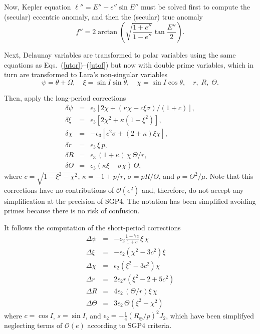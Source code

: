 \documentclass{article}
\begin{document}
Now, Kepler equation $\ell''=E''-e''\sin{E}''$ must be solved first to compute the (secular) eccentric anomaly, and then the (secular) true anomaly
\[
f''=2\arctan\left(\sqrt{\frac{1+e''}{1-e''}}\tan\frac{E''}{2}\right).
\]
\par

Next, Delaunay variables are transformed to polar variables using the same equations as Eqs.~(\ref{utor})--(\ref{utof}) but now with double prime variables, which in turn are transformed to Lara's non-singular variables
\[
\psi=\theta+\Omega,\quad \xi=\sin{I}\sin\theta,\quad \chi=\sin{I}\cos\theta,\quad r,\; R,\; \Theta.
\]


Then, apply the long-period corrections
\begin{eqnarray*} \label{dyns}
\delta\psi &=& \epsilon_3\left[2 \chi+(\kappa  \chi -c \xi  \sigma)/(1+c)\right],
\\  \label{dxins}
\delta\xi &=&
\epsilon_3\left[2 \chi ^2+\kappa  \left(1-\xi ^2\right) \right],
\\ \label{dchins}
\delta\chi &=& %
-\epsilon_3\left[c^2 \sigma +(2+\kappa) \xi  \chi \right],
\\ \label{drns}
\delta{r} &=& \epsilon_3\,\xi\,p,
\\ \label{dRRns}
\delta{R} &=& %
\epsilon_3\,(1+\kappa)\,\chi\,\Theta/r,
\\ \label{dZZns}
\delta\Theta &=&\epsilon_3(\kappa\xi-\sigma\chi)\,\Theta,
\end{eqnarray*}
where $c=\sqrt{1-\xi^2-\chi^2}$, $\kappa=-1+p/r$, $\sigma=pR/\Theta$, and $p=\Theta^2/\mu$. Note that this corrections have no contributions of $\mathcal{O}(e^2)$ and, therefore, do not accept any simplification at the precision of SGP4. The notation has been simplified avoiding primes because there is no risk of confusion.
\par


It follows the computation of the short-period corrections
\begin{eqnarray*}
\Delta\psi &=& -\epsilon_2\frac{1+7c}{1+c}\,\xi\,\chi
\\
\Delta\xi &=& -\epsilon_2\left(\chi^2-3c^2\right)\xi
\\[1ex]
\Delta\chi &=& \epsilon_2\left(\xi^2-3c^2\right)\chi
\\
\Delta{r} &=& %
2\epsilon_2r\left(\xi^2-2+5c^2\right)
\\
\Delta{R} &=& %
4\epsilon_2\,(\Theta/r)\xi\,\chi
\\
\Delta\Theta &=&  3\epsilon_2\,\Theta(\xi^2-\chi^2)
\end{eqnarray*}
where $c=\cos{I}$, $s=\sin{I}$, and $\epsilon_2=-\frac{1}{4}(R_\oplus/p)^2J_2$, which have been simplifyed neglecting terms of $\mathcal{O}(e)$ according to SGP4 criteria.
\par
\end{document}
